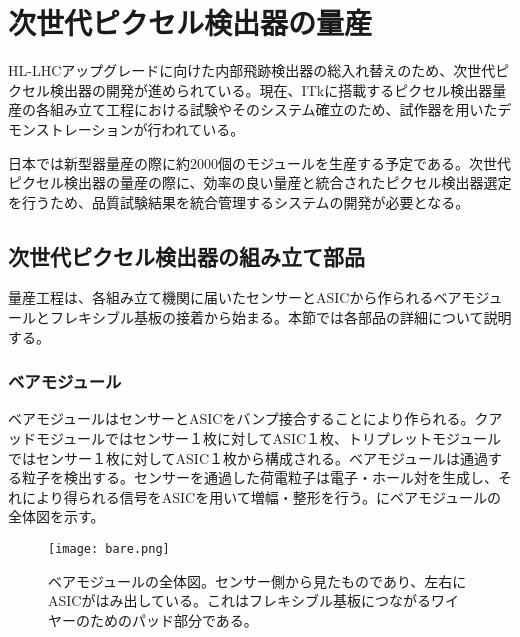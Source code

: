 \chapter{次世代ピクセル検出器の量産}
\label{sec:singatapixel-devel}
HL-LHCアップグレードに向けた内部飛跡検出器の総入れ替えのため、次世代ピクセル検出器の開発が進められている。現在、ITkに搭載するピクセル検出器量産の各組み立て工程における試験やそのシステム確立のため、試作器を用いたデモンストレーションが行われている。

日本では新型器量産の際に約$2000$個のモジュールを生産する予定である。次世代ピクセル検出器の量産の際に、効率の良い量産と統合されたピクセル検出器選定を行うため、品質試験結果を統合管理するシステムの開発が必要となる。


\section{次世代ピクセル検出器の組み立て部品}
\label{sec:component}
量産工程は、各組み立て機関に届いたセンサーとASICから作られるベアモジュールとフレキシブル基板の接着から始まる。本節では各部品の詳細について説明する。


\subsection{ベアモジュール}
\label{sec:bare}

ベアモジュールはセンサーとASICをバンプ接合することにより作られる。クアッドモジュールではセンサー１枚に対してASIC１枚、トリプレットモジュールではセンサー１枚に対してASIC１枚から構成される。ベアモジュールは通過する粒子を検出する。センサーを通過した荷電粒子は電子・ホール対を生成し、それにより得られる信号をASICを用いて増幅・整形を行う。にベアモジュールの全体図を示す。
\begin{figure}[tbp]
  \centering
  \texttt{[image: bare.png]}
  \caption[ベアモジュール]{ベアモジュールの全体図。センサー側から見たものであり、左右にASICがはみ出している。これはフレキシブル基板につながるワイヤーのためのパッド部分である。}
  \label{fig:bare}
\end{figure}

